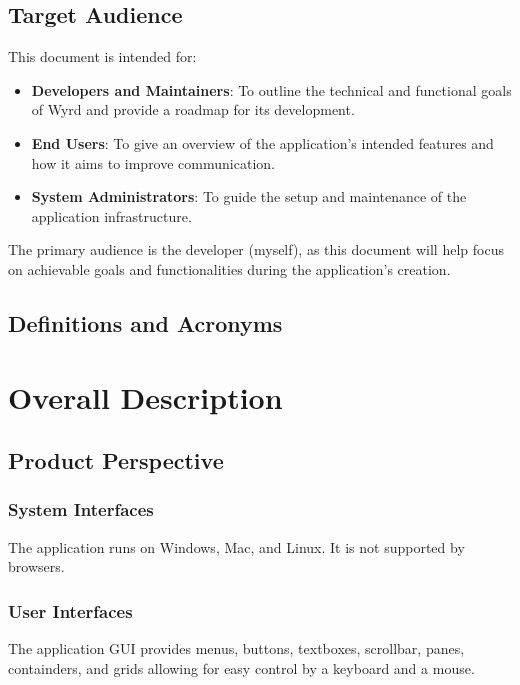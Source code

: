 \documentclass{scrreprt}
\begin{document}
\section{Target Audience}
This document is intended for:
    \begin{itemize}
        \item \textbf{Developers and Maintainers}: To outline the technical and functional goals of Wyrd and provide a roadmap for its development.
        \item \textbf{End Users}: To give an overview of the application's intended features and how it aims to improve communication.
        \item \textbf{System Administrators}: To guide the setup and maintenance of the application infrastructure.
    \end{itemize}
The primary audience is the developer (myself), as this document will help focus on achievable goals and functionalities during the application's creation.

\section{Definitions and Acronyms}

\chapter{Overall Description}

\section{Product Perspective}
    \subsection{System Interfaces}
    The application runs on Windows, Mac, and Linux. It is not supported by browsers.
    \subsection{User Interfaces}
    The application GUI provides menus, buttons, textboxes, scrollbar, panes, containders, and grids allowing for
    easy control by a keyboard and a mouse. 
\end{document}
